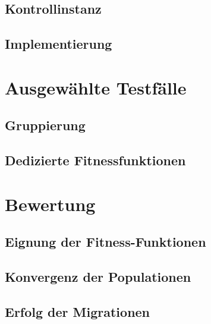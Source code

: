 \documentclass[12pt,a4paper]{article}
\begin{document}
\subsection{Kontrollinstanz}

\subsection{Implementierung}

\section{Ausgewählte Testfälle}
\subsection{Gruppierung}
\subsection{Dedizierte Fitnessfunktionen}

\section{Bewertung}
\subsection{Eignung der Fitness-Funktionen}
\subsection{Konvergenz der Populationen}
\subsection{Erfolg der Migrationen}
\end{document}
